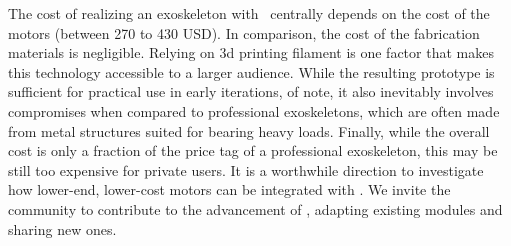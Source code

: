 The cost of realizing an exoskeleton with \toolkit~centrally depends on the cost of the motors (between 270 to 430 USD). In comparison, the cost of the fabrication materials is negligible. Relying on 3d printing filament is one factor that makes this technology accessible to a larger audience. While the resulting prototype is sufficient for practical use in early iterations, of note, it also inevitably involves compromises when compared to professional exoskeletons, which are often made from metal structures suited for bearing heavy loads.
Finally, while the overall cost is only a fraction of the price tag of a professional exoskeleton, this may be still too expensive for private users. It is a worthwhile direction to investigate how lower-end, lower-cost motors can be integrated with \toolkit. We invite the community to contribute to the advancement of \toolkit, adapting existing modules and sharing new ones. 
